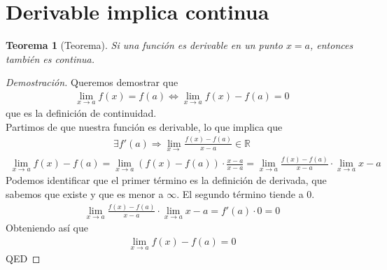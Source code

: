 \documentclass{article}
\newtheorem{derivableLuegoContinua}{Teorema}
\begin{document}
\section{Derivable implica continua}
\begin{derivableLuegoContinua}[Teorema]
    Si una función es derivable en un punto $x=a$, entonces también es continua.
\end{derivableLuegoContinua}
\begin{proof}[Demostración]
    Queremos demostrar que
    \begin{equation}
        \begin{split}
            \lim_{x \to a} f(x)=f(a) \iff \lim_{x \to a} f(x)-f(a)=0
        \end{split}
    \end{equation}
    que es la definición de continuidad.\\
    Partimos de que nuestra función es derivable, lo que implica que
    \begin{equation}
        \begin{split}
            \exists f'(a) \Rightarrow \lim_{x \to} \frac{f(x)-f(a)}{x-a} \in \mathbb{R}
        \end{split}
    \end{equation}  
    \begin{equation}
        \begin{split}
            \lim_{x \to a} f(x)-f(a) = \lim_{x \to a} (f(x)-f(a)) \cdot \frac{x-a}{x-a}
            = \lim_{x \to a} \frac{f(x)-f(a)}{x-a} \cdot \lim_{x \to a} x-a
        \end{split}
    \end{equation}
Podemos identificar que el primer término es la definición de derivada, que sabemos que existe y
que es menor a $\infty$. El segundo término tiende a $0$.
\begin{equation}
    \begin{split}
        \lim_{x \to a} \frac{f(x)-f(a)}{x-a} \cdot \lim_{x \to a} x-a =f'(a) \cdot 0=0
    \end{split}
\end{equation}
Obteniendo así que
\begin{equation}
    \begin{split}
        \lim_{x \to a} f(x) -f(a)=0
    \end{split}
\end{equation}
QED
\end{proof}
\end{document}
